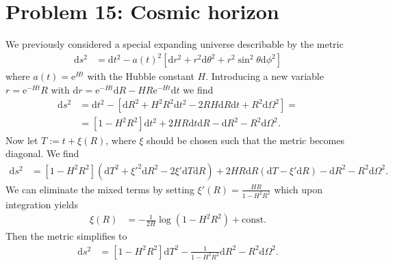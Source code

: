 \documentclass[english, parskip=full]{scrartcl}
\newcommand{\kla}{}
\newcommand{\klam}{}
\newcommand{\tecxt}{}
\newcommand{\e}{\text{e}}
\begin{document}
\section*{Problem 15: Cosmic horizon}
We previously considered a special expanding universe describable by the metric
\begin{align}
\tecxt\text{d}s^2 &= \tecxt\text{d}t^2 - a(t)^2 \klam\left[ \tecxt\text{d}r^2 + r^2\tecxt\text{d}\theta^2 + r^2\sin^2\theta \tecxt\text{d}\phi^2 \right]
\end{align}
where $a(t) = \e^{Ht}$ with the Hubble constant $H$.
Introducing a new variable $r = \e^{-Ht} R$ with $\tecxt\text{d}r = \e^{-Ht} \tecxt\text{d}R - HR\e^{-Ht} \tecxt\text{d}t$ we find
\begin{align}
\tecxt\text{d}s^2 &= \tecxt\text{d}t^2 - \klam\left[ \tecxt\text{d}R^2 + H^2R^2 \tecxt\text{d}t^2 - 2RH \tecxt\text{d}R \tecxt\text{d}t + R^2 \tecxt\text{d}\Omega^2 \right] = \\
&= \klam\left[ 1 - H^2R^2 \right]\tecxt\text{d}t^2 + 2HR\tecxt\text{d}t \tecxt\text{d}R - \tecxt\text{d}R^2 - R^2\tecxt\text{d}\Omega^2.
\end{align}
Now let $T:= t + \xi(R)$, where $\xi$ should be chosen such that the metric becomes diagonal.
We find
\begin{align}
\tecxt\text{d}s^2 &= \klam\left[ 1 - H^2R^2 \right] \kla\left( \tecxt\text{d}T^2 + \xi'^2 \tecxt\text{d}R^2 - 2\xi' \tecxt\text{d}T \tecxt\text{d}R \right) + 2HR \tecxt\text{d}R \kla\left( \tecxt\text{d}T - \xi'\tecxt\text{d}R \right) - \tecxt\text{d}R^2 - R^2\tecxt\text{d}\Omega^2.
\end{align}
We can eliminate the mixed terms by setting $\xi'(R) = \frac{HR}{1-H^2R^2}$ which upon integration yields
\begin{align}
\xi(R) &= -\frac{1}{2H}\log \kla\left( 1 - H^2R^2 \right) + \tecxt\text{const}.
\end{align}
Then the metric simplifies to
\begin{align}
\tecxt\text{d}s^2 &= \klam\left[ 1 - H^2R^2 \right] \tecxt\text{d}T^2 - \frac{1}{1 - H^2R^2} \tecxt\text{d}R^2 - R^2\tecxt\text{d}\Omega^2.
\end{align}


\end{document}
